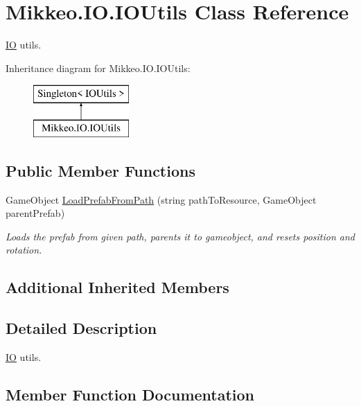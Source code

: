 \hypertarget{class_mikkeo_1_1_i_o_1_1_i_o_utils}{}\section{Mikkeo.\+I\+O.\+I\+O\+Utils Class Reference}
\label{class_mikkeo_1_1_i_o_1_1_i_o_utils}


\hyperlink{namespace_mikkeo_1_1_i_o}{IO} utils.  


Inheritance diagram for Mikkeo.\+I\+O.\+I\+O\+Utils\+:\begin{figure}[H]
\begin{center}
\leavevmode
\includegraphics[height=2.000000cm]{class_mikkeo_1_1_i_o_1_1_i_o_utils}
\end{center}
\end{figure}
\subsection*{Public Member Functions}
\begin{DoxyCompactItemize}
\item 
Game\+Object \hyperlink{class_mikkeo_1_1_i_o_1_1_i_o_utils_a8016592d2b54d683f575e04495b992c3}{Load\+Prefab\+From\+Path} (string path\+To\+Resource, Game\+Object parent\+Prefab)
\begin{DoxyCompactList}\small\item\em Loads the prefab from given path, parents it to gameobject, and resets position and rotation. \end{DoxyCompactList}\end{DoxyCompactItemize}
\subsection*{Additional Inherited Members}


\subsection{Detailed Description}
\hyperlink{namespace_mikkeo_1_1_i_o}{IO} utils. 



\subsection{Member Function Documentation}
